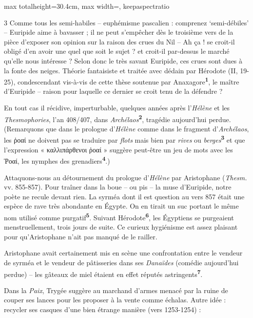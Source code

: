 \documentclass[11pt,twoside]{book}
\newcommand{\italique}[1]{\textit{#1}}
\newcommand{\marqueur}[1]{\textsuperscript{\color{rubricRed}\textbf{#1}}}
\begin{document}
\begin{adjustbox}{max totalheight=30.4cm, max width=\textwidth, keepaspectratio}
\begin{minipage}{\textwidth}
{\begin{multicols}{3}
\noindent Comme tous les semi-habiles – euphémisme pascalien : comprenez `semi-débiles' – Euripide aime à bavasser ; il ne peut s'empêcher dès le troisième vers de la pièce d'exposer son opinion sur la raison des crues du Nil – Ah ça ! se croit-il obligé d'en avoir une quel que soit le sujet ? et croit-il par-dessus le marché qu'elle nous intéresse ? Selon donc le très savant Euripide, ces crues sont dues à la fonte des neiges. Théorie fantaisiste et traitée avec dédain par Hérodote (II, 19-25), condescendant vis-à-vis de cette thèse soutenue par Anaxagore\marqueur{1}, le maître d'Euripide – raison pour laquelle ce dernier se croit tenu de la défendre ?
\par\vspace{1.5pt}
\noindent En tout cas il récidive, imperturbable, quelques années après l'\italique{Hélène} et les \italique{Thesmophories}, l'an 408/407, dans \italique{Archélaos}\marqueur{2}, tragédie aujourd'hui perdue. (Remarquons que dans le prologue d'\italique{Hélène} comme dans le fragment d'\italique{Archélaos}, les ῥοαί ne doivent pas se traduire par \italique{flots} mais bien par \italique{rives} ou \italique{berges}\marqueur{3} et que l'expression « καλλιπάρθενοι ῥοαί » suggère peut-être un jeu de mots avec les Ῥοαί, les nymphes des grenadiers\marqueur{4}.)
\par\vspace{1.5pt}
\noindent Attaquons-nous au détournement du prologue d'\italique{Hélène} par Aristophane (\italique{Thesm.} vv. 855-857). Pour traîner dans la boue – ou pis – la muse d'Euripide, notre poète ne recule devant rien. La syrméa dont il est question au vers 857 était une espèce de rave très abondante en Égypte. On en tirait un suc portant le même nom utilisé comme purgatif\marqueur{5}. Suivant Hérodote\marqueur{6}, les Égyptiens se purgeaient menstruellement, trois jours de suite. Ce curieux hygiénisme est assez plaisant pour qu'Aristophane n'ait pas manqué de le railler.
\par\vspace{1.5pt}
\noindent Aristophane avait certainement mis en scène une confrontation entre le vendeur de syrméa et le vendeur de pâtisseries dans ses \italique{Danaïdes} (comédie aujourd'hui perdue) – les gâteaux de miel étaient en effet réputés astringents\marqueur{7}.
\par\vspace{1.5pt}
\noindent Dans la \italique{Paix}, Trygée suggère au marchand d'armes menacé par la ruine de couper ses lances pour les proposer à la vente comme échalas. Autre idée : recycler ses casques d'une bien étrange manière (vers 1253-1254) :

\end{multicols}}
\end{minipage}
\end{adjustbox}
\end{document}
